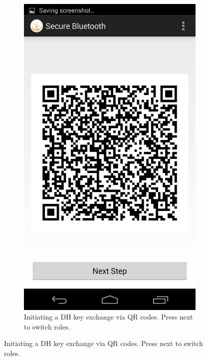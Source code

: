 \documentclass[conference, 11pt]{sty/IEEEtran}
\begin{document}
\begin{figure}
\begin{subfigure}{0.28\textwidth}
\includegraphics[width=\textwidth]{../screenshots/Screenshot_2013-12-01-20-51-32.png}
\caption{Initiating a DH key exchange via QR codes. Press next to switch roles.}
\end{subfigure}


\end{figure}
\end{document}
